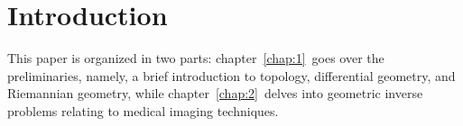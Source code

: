 \section{Introduction}
\label{sec:introduction}

\noindent
This paper is organized in two parts: chapter~\ref{chap:1}~goes over the preliminaries, namely, a brief introduction to topology, differential geometry, and Riemannian geometry, while chapter~\ref{chap:2}~delves into geometric inverse problems relating to medical imaging techniques.
